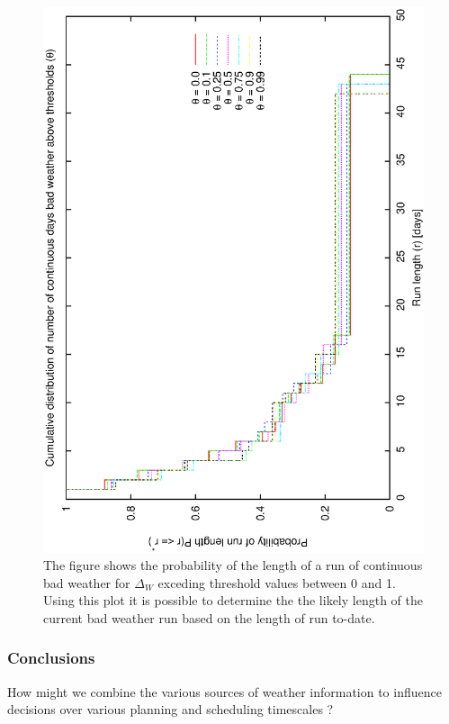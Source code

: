 {{\begin{figure}[htbp]
\begin{center}
    \includegraphics[scale=0.4, angle=-90]{figures/ecs/run_len_thresh.eps}
\end{center}
\caption[Cumulative probability of lengths of bad weather runs for variable threshold value.]
{The figure shows the probability of the length of a run of continuous bad weather for $\Delta_W$ exceding threshold values between 0 and 1. Using this plot it is possible to determine the the likely length of the current bad weather run based on the length of run to-date.}
\label{fig:ecs_run_len}
\end{figure}



\subsubsection{Conclusions}
How might we combine the various sources of weather information to influence decisions over various planning and scheduling timescales ?


}}
